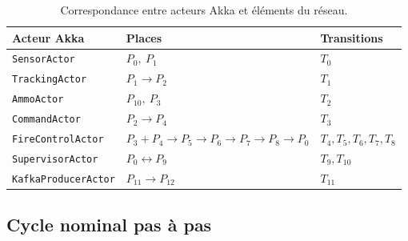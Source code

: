 \documentclass[11pt,a4paper]{article}
\newcommand{\code}[1]{\texttt{#1}}
\begin{document}
\begin{table}[H]
\centering\small
\begin{tabularx}{\linewidth}{l X X}
\toprule
\rowcolor{tableheader}\textbf{Acteur Akka} & \textbf{Places} & \textbf{Transitions} \\
\midrule
\code{SensorActor}          & $P_0,\ P_1$
                            & $T_0$ \\
\code{TrackingActor}        & $P_1 \to P_2$
                            & $T_1$ \\
\code{AmmoActor}            & $P_{10},\ P_3$
                            & $T_2$ \\
\code{CommandActor}         & $P_2 \to P_4$
                            & $T_3$ \\
\code{FireControlActor}     & $P_3 + P_4 \to P_5 \to P_6 \to P_7 \to P_8 \to P_0$
                            & $T_4, T_5, T_6, T_7, T_8$ \\
\code{SupervisorActor}      & $P_0 \leftrightarrow P_9$
                            & $T_9, T_{10}$ \\
\code{KafkaProducerActor}   & $P_{11} \to P_{12}$
                            & $T_{11}$ \\
\bottomrule
\end{tabularx}
\caption{Correspondance entre acteurs Akka et éléments du réseau.}
\end{table}

\subsection{Cycle nominal pas à pas}
\end{document}

